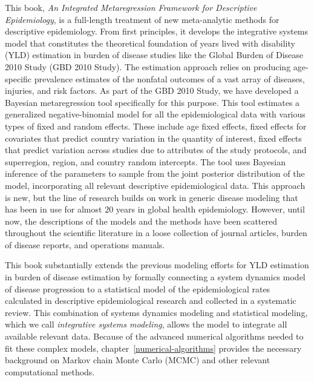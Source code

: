 This book, \emph{An Integrated Metaregression Framework for Descriptive
  Epidemiology}, is a full-length treatment of new meta-analytic
methods for descriptive epidemiology.  From first principles, it
develops the integrative systems model that constitutes the
theoretical foundation of years lived with disability (YLD) estimation
in burden of disease studies like the Global Burden of Disease 2010
Study (GBD 2010 Study).  The estimation approach relies on producing
age-specific prevalence estimates of the nonfatal outcomes of a vast
array of diseases, injuries, and risk factors.  As part of the GBD
2010 Study, we have developed a Bayesian metaregression tool
specifically for this purpose. This tool estimates a generalized
negative-binomial model for all the epidemiological data with various
types of fixed and random effects.  These include age fixed effects,
fixed effects for covariates that predict country variation in the
quantity of interest, fixed effects that predict variation across
studies due to attributes of the study protocols, and superregion,
region, and country random intercepts.  The tool uses Bayesian
inference of the parameters to sample from the joint posterior
distribution of the model, incorporating all relevant descriptive
epidemiological data.  This approach is new, but the line of research
builds on work in generic disease modeling that has been in use for
almost $20$ years in global health
epidemiology.\cite{Barendregt_Generic_2003} However, until now, the
descriptions of the models and the methods have been scattered throughout
the scientific literature in a loose collection of journal articles,
burden of disease reports, and operations manuals.

This book substantially extends the previous modeling efforts for YLD
estimation in burden of disease estimation by formally connecting a
system dynamics model of disease progression to a statistical model of
the epidemiological rates calculated in descriptive
epidemiological research and collected in a systematic
review.  This combination of systems dynamics modeling and statistical
modeling, which we call
\emph{integrative systems modeling}, allows the model to integrate all
available relevant data.  Because of the advanced numerical algorithms needed to fit these complex models, chapter~\ref{numerical-algorithms} provides the
necessary background on Markov chain Monte Carlo (MCMC) and other
relevant computational methods.

